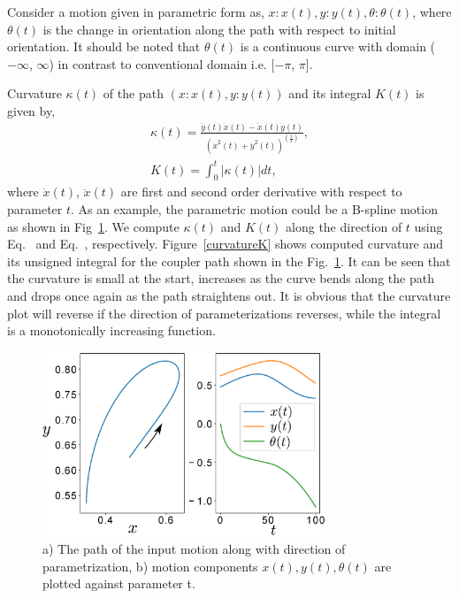 Consider a motion given in parametric form as, $x:x(t), y:y(t), \theta:\theta(t)$, where $\theta(t)$ is the change in orientation along the path with respect to initial orientation.
It should be noted that $\theta(t)$ is a continuous curve with domain ($-\infty$, $\infty$) in contrast to conventional domain i.e. [$-\pi$, $\pi$].

Curvature $\kappa(t)$ of the path $(x:x(t), y:y(t))$ and its integral $K(t)$ is given by,
\begin{eqnarray}
  \kappa(t) = \frac{\ddot{y}(t)\dot{x}(t) - \ddot{x}(t)\dot{y}(t)}{{(\dot{x}^2(t) + \dot{y}^2(t))}^{(\frac 32)}}, \label{curvatureEq}\\
  K(t) = \int^{t}_0 |\kappa(t)|dt \label{kInt},
\end{eqnarray}
where $\dot{x}(t)$, $\ddot{x}(t)$ are first and second order derivative with respect to parameter $t$.
As an example, the parametric motion could be a B-spline motion as shown in Fig~\ref{bsplineFitting}.
We compute $\kappa(t)$ and $K(t)$ along the direction of $t$ using Eq.~ and Eq.~, respectively.
Figure~\ref{curvatureK} shows computed curvature and its unsigned integral for the coupler path shown in the Fig.~\ref{bsplineFitting}.
It can be seen that the curvature is small at the start, increases as the curve bends along the path and drops once again as the path straightens out. It is obvious that the curvature plot will reverse if the direction of parameterizations reverses, while the integral is a monotonically increasing function.

\begin{figure}
\centering
\includegraphics[width=240pt]{jcise-18/figure/fig_bspline.eps}
  \caption{a) The path of the input motion along with direction of parametrization, b) motion components $x(t), y(t), \theta(t)$ are plotted against parameter t.}
\label{bsplineFitting}
\end{figure}

